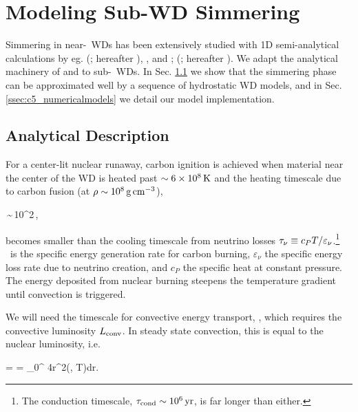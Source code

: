 \section{Modeling Sub-\Mch WD Simmering}
\label{sec:c5_modelsim}

Simmering in near-\Mch\ WDs has been extensively studied with 1D semi-analytical calculations by eg. \citeauthor{wooswk04} (\citeyear{wooswk04}; hereafter \citeal{wooswk04}), \cite{lesa+06, piro08}, and \citeauthor{piroc08}; (\citeyear{piroc08}; hereafter \citeal{piroc08}).  We adapt the analytical machinery of \citeal{wooswk04} and \citeal{piroc08} to sub-\Mch\ WDs.  In Sec. \ref{ssec:c5_simmer} we show that the simmering phase can be approximated well by a sequence of hydrostatic WD models, and in Sec. \ref{ssec:c5_numericalmodels} we detail our model implementation.

\subsection{Analytical Description}
\label{ssec:c5_simmer}


For a center-lit nuclear runaway, carbon ignition is achieved when material near the center of the WD is heated past $\sim 6 \times10^8\,\mathrm{K}$ and the heating timescale due to carbon fusion (at $\rho \sim 10^8\,\gcc$),

\eqbegin
\taucc \equiv {}\,\sim\,10^2\,,
\label{eq:c5_taucc}
\eqend

\noindent becomes smaller than the cooling timescale from neutrino losses $\taunu\equiv c_P T/\varepsilon_\nu$.\footnote{The conduction timescale, $\taucond \sim 10^6\,\mrm{yr}$, is far longer than either.}  \epscc\ is the specific energy generation rate for carbon burning, $\varepsilon_\nu$ the specific energy loss rate due to neutrino creation, and $c_P$ the specific heat at constant pressure.  The energy deposited from nuclear burning steepens the temperature gradient until convection is triggered.


We will need the timescale for convective energy transport, \tauconv, which requires the convective luminosity $\Lconv$.  In steady state convection, this is equal to the nuclear luminosity, i.e.

\eqbegin
\Lconv = \Lcc = \int_0^{\Rwd} 4\pi r^2\rho \epscc(\rho, T)dr.
\label{eq:c5_convlum}
\eqend

